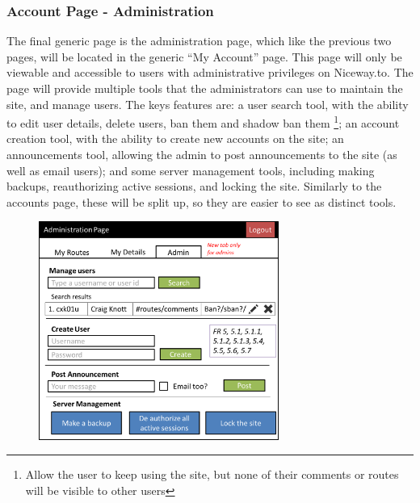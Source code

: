 \subsubsection{Account Page - Administration}
The final generic page is the administration page, which like the previous two pages, will be located in the generic ``My Account'' page. This page will only be viewable and accessible to users with administrative privileges on Niceway.to. The page will provide multiple tools that the administrators can use to maintain the site, and manage users. The keys features are: a user search tool, with the ability to edit user details, delete users, ban them and shadow ban them \footnote{Allow the user to keep using the site, but none of their comments or routes will be visible to other users}; an account creation tool, with the ability to create new accounts on the site; an announcements tool, allowing the admin to post announcements to the site (as well as email users); and some server management tools, including making backups, reauthorizing active sessions, and locking the site. Similarly to the accounts page, these will be split up, so they are easier to see as distinct tools. 
\begin{figure}[!ht]
	\begin{center}
		\includegraphics[width=0.7\textwidth]{images/ui-admin.png}
	\end{center}
	\vspace{-6mm}
\end{figure}


 
